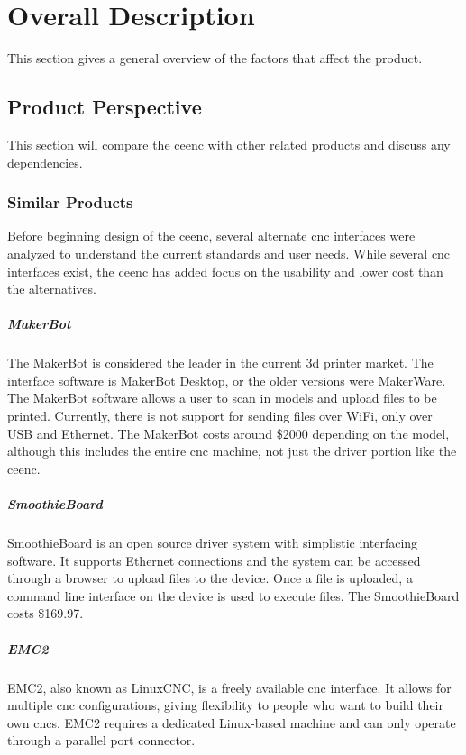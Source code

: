 \chapter{Overall Description}
This section gives a general overview of the factors that affect the product.

\section{Product Perspective}
This section will compare the \gls{ceenc} with other related products and discuss any dependencies.

\subsection{Similar Products}
Before beginning design of the \gls{ceenc}, several alternate \gls{cnc} interfaces were analyzed to understand the current standards and user needs.
While several \gls{cnc} interfaces exist, the \gls{ceenc} has added focus on the usability and lower cost than the alternatives.
\paragraph{MakerBot}
The MakerBot is considered the leader in the current \gls{3d} printer market.
The interface software is MakerBot Desktop, or the older versions were MakerWare.
The MakerBot software allows a user to scan in models and upload files to be printed.
Currently, there is not support for sending files over WiFi, only over USB and Ethernet.
The MakerBot costs around \$2000 depending on the model, although this includes the entire \gls{cnc} machine, not just the driver portion like the \gls{ceenc}.
\paragraph{SmoothieBoard}
SmoothieBoard is an open source driver system with simplistic interfacing software.
It supports Ethernet connections and the system can be accessed through a browser to upload files to the device.
Once a file is uploaded, a command line interface on the device is used to execute files.
The SmoothieBoard costs \$169.97.
\paragraph{EMC2}
EMC2, also known as LinuxCNC, is a freely available \gls{cnc} interface.
It allows for multiple \gls{cnc} configurations, giving flexibility to people who want to build their own \gls{cnc}s.
EMC2 requires a dedicated Linux-based machine and can only operate through a parallel port connector.
